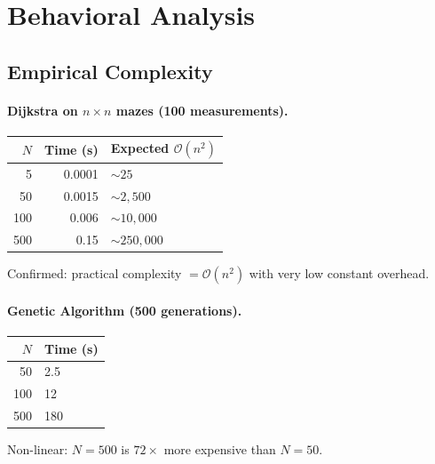 \documentclass[12pt, a4paper]{article}
\theoremstyle{definition}
\newcommand{\bigO}[1]{\mathcal{O}\!\left(#1\right)}
\begin{document}
\section{Behavioral Analysis}

\subsection{Empirical Complexity}

\paragraph{Dijkstra on $n \times n$ mazes (100 measurements).}

\begin{center}
\begin{tabular}{rrl}
    \toprule
    $N$ & Time (s) & Expected $\bigO{n^2}$ \\
    \midrule
    5   & 0.0001 & $\sim 25$       \\
    50  & 0.0015 & $\sim 2{,}500$  \\
    100 & 0.006  & $\sim 10{,}000$ \\
    500 & 0.15   & $\sim 250{,}000$\\
    \bottomrule
\end{tabular}
\end{center}

Confirmed: practical complexity $= \bigO{n^2}$ with very low constant overhead.

\paragraph{Genetic Algorithm (500 generations).}

\begin{center}
\begin{tabular}{rl}
    \toprule
    $N$ & Time (s) \\
    \midrule
    50  & 2.5  \\
    100 & 12   \\
    500 & 180  \\
    \bottomrule
\end{tabular}
\end{center}

Non-linear: $N = 500$ is $72\times$ more expensive than $N = 50$.
\end{document}
